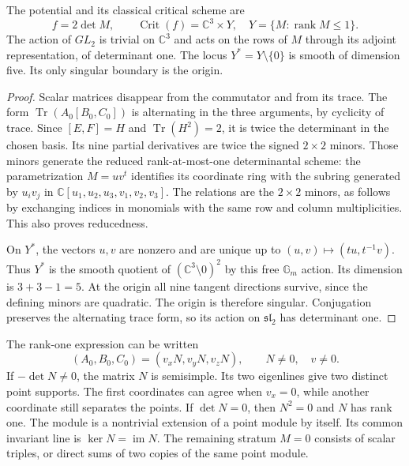 \begin{proposition}
\label{prop:c3-full-determinant}
The potential and its classical critical scheme are
\begin{equation}
 f=2\det M,\qquad
 \operatorname{Crit}(f)=\mathbb C^3\times Y,
 \quad Y=\{M:\operatorname{rank}M\leq1\}.
 \label{eq:c3-full-determinant}
\end{equation}
The action of $GL_2$ is trivial on $\mathbb C^3$ and acts on the
rows of $M$ through its adjoint representation, of determinant one.
The locus $Y^*=Y\setminus\{0\}$ is smooth of dimension five.
Its only singular boundary is the origin.
\end{proposition}

\begin{proof}
Scalar matrices disappear from the commutator and from its trace.
The form $\operatorname{Tr}(A_0[B_0,C_0])$ is alternating in the
three arguments, by cyclicity of trace. Since $[E,F]=H$ and
$\operatorname{Tr}(H^2)=2$, it is twice the determinant in the chosen
basis. Its nine partial derivatives are twice the signed $2\times2$
minors. Those minors generate the reduced rank-at-most-one
determinantal scheme: the parametrization $M=u v^t$ identifies its
coordinate ring with the subring generated by $u_i v_j$ in
$\mathbb C[u_1,u_2,u_3,v_1,v_2,v_3]$.
The relations are the $2\times2$ minors, as follows by exchanging
indices in monomials with the same row and column multiplicities.
This also proves reducedness.

On $Y^*$, the vectors $u,v$ are nonzero and are unique up to
$(u,v)\mapsto(tu,t^{-1}v)$. Thus $Y^*$ is the smooth quotient
of $(\mathbb C^3\setminus0)^2$ by this free $\mathbb G_m$ action.
Its dimension is $3+3-1=5$. At the origin all nine tangent directions
survive, since the defining minors are quadratic. The origin is
therefore singular. Conjugation preserves the alternating trace form,
so its action on $\mathfrak{sl}_2$ has determinant one.
\end{proof}

The rank-one expression can be written
\[
 (A_0,B_0,C_0)=(v_xN,v_yN,v_zN),\qquad N\ne0,
 \quad v\ne0.
\]
If $-\det N\ne0$, the matrix $N$ is semisimple. Its two eigenlines
give two distinct point supports. The first coordinates can agree
when $v_x=0$, while another coordinate still separates the points.
If $\det N=0$, then $N^2=0$ and $N$ has rank one. The module is a
nontrivial extension of a point module by itself. Its common invariant
line is $\ker N=\operatorname{im}N$.
The remaining stratum $M=0$ consists of scalar triples, or direct
sums of two copies of the same point module.

